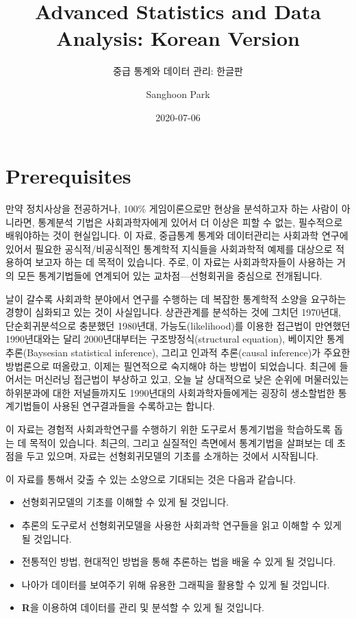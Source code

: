 \documentclass[
]{book}
\title{Advanced Statistics and Data Analysis: Korean Version}
\subtitle{중급 통계와 데이터 관리: 한글판}
\author{Sanghoon Park}
\date{2020-07-06}
\providecommand{\tightlist}{%
  \setlength{\itemsep}{0pt}\setlength{\parskip}{0pt}}
\begin{document}
\maketitle

{
\hypersetup{linkcolor=}
\setcounter{tocdepth}{1}
\tableofcontents
}
\hypertarget{prerequisites}{%
\chapter{Prerequisites}\label{prerequisites}}

만약 정치사상을 전공하거나, 100\% 게임이론으로만 현상을 분석하고자 하는 사람이 아니라면, 통계분석 기법은 사회과학자에게 있어서 더 이상은 피할 수 없는, 필수적으로 배워야하는 것이 현실입니다. 이 자료, 중급통계 통계와 데이터관리는 사회과학 연구에 있어서 필요한 공식적/비공식적인 통계학적 지식들을 사회과학적 예제를 대상으로 적용하여 보고자 하는 데 목적이 있습니다. 주로, 이 자료는 사회과학자들이 사용하는 거의 모든 통계기법들에 연계되어 있는 교차점---선형회귀을 중심으로 전개됩니다.

날이 갈수록 사회과학 분야에서 연구를 수행하는 데 복잡한 통계학적 소양을 요구하는 경향이 심화되고 있는 것이 사실입니다. 상관관계를 분석하는 것에 그치던 1970년대, 단순회귀분석으로 충분했던 1980년대, 가능도(likelihood)를 이용한 접근법이 만연했던 1990년대와는 달리 2000년대부터는 구조방정식(structural equation), 베이지안 통계 추론(Baysesian statistical inference), 그리고 인과적 추론(causal inference)가 주요한 방법론으로 떠올랐고, 이제는 필연적으로 숙지해야 하는 방법이 되었습니다. 최근에 들어서는 머신러닝 접근법이 부상하고 있고, 오늘 날 상대적으로 낮은 순위에 머물러있는 하위분과에 대한 저널들까지도 1990년대의 사회과학자들에게는 굉장히 생소할법한 통계기법들이 사용된 연구결과들을 수록하고는 합니다.

이 자료는 경험적 사회과학연구를 수행하기 위한 도구로서 통계기법을 학습하도록 돕는 데 목적이 있습니다. 최근의, 그리고 실질적인 측면에서 통계기법을 살펴보는 데 초점을 두고 있으며, 자료는 선형회귀모델의 기초를 소개하는 것에서 시작됩니다.

이 자료를 통해서 갖출 수 있는 소양으로 기대되는 것은 다음과 같습니다.

\begin{itemize}
\tightlist
\item
  선형회귀모델의 기초를 이해할 수 있게 될 것입니다.
\item
  추론의 도구로서 선형회귀모델을 사용한 사회과학 연구들을 읽고 이해할 수 있게 될 것입니다.
\item
  전통적인 방법, 현대적인 방법을 통해 추론하는 법을 배울 수 있게 될 것입니다.
\item
  나아가 데이터를 보여주기 위해 유용한 그래픽을 활용할 수 있게 될 것입니다.
\item
  \textbf{R}을 이용하여 데이터를 관리 및 분석할 수 있게 될 것입니다.
\end{itemize}
\end{document}
